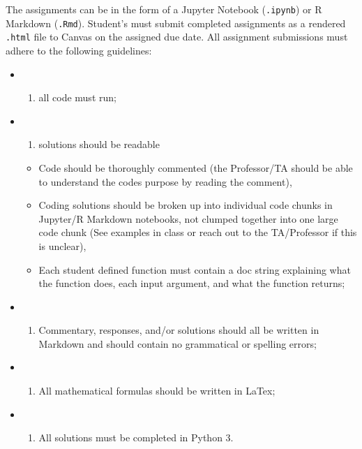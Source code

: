 \documentclass[
  12pt,
]{article}
\providecommand{\tightlist}{%
  \setlength{\itemsep}{0pt}\setlength{\parskip}{0pt}}
\begin{document}
The assignments can be in the form of a Jupyter Notebook
(\texttt{.ipynb}) or R Markdown (\texttt{.Rmd}). Student's must submit
completed assignments as a rendered \texttt{.html} file to Canvas on the
assigned due date. All assignment submissions must adhere to the
following guidelines:

\begin{itemize}
\item
  \begin{enumerate}
  \def\labelenumi{(\roman{enumi})}
  \tightlist
  \item
    all code must run;
  \end{enumerate}
\item
  \begin{enumerate}
  \def\labelenumi{(\roman{enumi})}
  \setcounter{enumi}{1}
  \tightlist
  \item
    solutions should be readable
  \end{enumerate}

  \begin{itemize}
  \tightlist
  \item
    Code should be thoroughly commented (the Professor/TA should be able
    to understand the codes purpose by reading the comment),
  \item
    Coding solutions should be broken up into individual code chunks in
    Jupyter/R Markdown notebooks, not clumped together into one large
    code chunk (See examples in class or reach out to the TA/Professor
    if this is unclear),
  \item
    Each student defined function must contain a doc string explaining
    what the function does, each input argument, and what the function
    returns;
  \end{itemize}
\item
  \begin{enumerate}
  \def\labelenumi{(\roman{enumi})}
  \setcounter{enumi}{2}
  \tightlist
  \item
    Commentary, responses, and/or solutions should all be written in
    Markdown and should contain no grammatical or spelling errors;
  \end{enumerate}
\item
  \begin{enumerate}
  \def\labelenumi{(\roman{enumi})}
  \setcounter{enumi}{3}
  \tightlist
  \item
    All mathematical formulas should be written in LaTex;
  \end{enumerate}
\item
  \begin{enumerate}
  \def\labelenumi{(\alph{enumi})}
  \setcounter{enumi}{21}
  \tightlist
  \item
    All solutions must be completed in Python 3.
  \end{enumerate}
\end{itemize}
\end{document}
